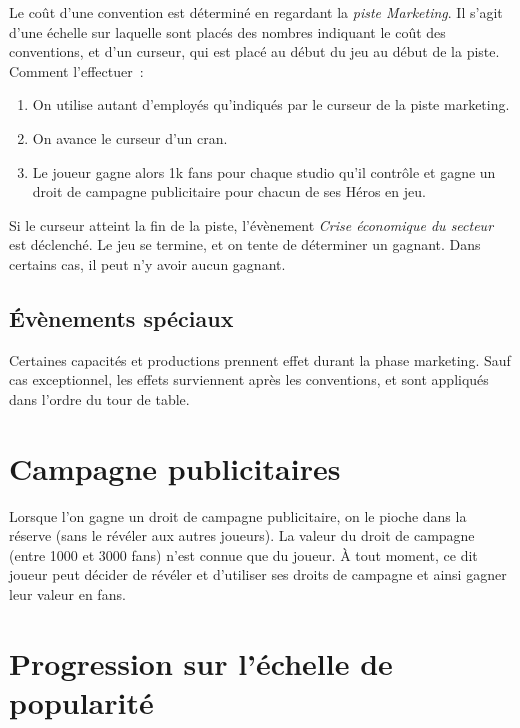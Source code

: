                 Le coût d'une convention est déterminé en regardant la \textit{piste Marketing}. Il s'agit
                d'une échelle sur laquelle sont placés des nombres indiquant le coût des conventions, et d'un
                curseur, qui est placé au début du jeu au début de la piste.
                \\
                Comment l'effectuer :
                    \begin{enumerate}
                        \item On utilise autant d'employés qu'indiqués par le curseur de la piste marketing.
                        \item On avance le curseur d'un cran.
                        \item Le joueur gagne alors 1k fans pour chaque studio qu'il contrôle et gagne un droit de campagne publicitaire pour chacun de ses Héros en jeu.
                    \end{enumerate}

                Si le curseur atteint la fin de la piste, l'évènement \textit{Crise économique du secteur} est déclenché.
                Le jeu se termine, et on tente de déterminer un gagnant. Dans certains cas, il peut n'y avoir aucun gagnant.

            \subsection{Évènements spéciaux}

                Certaines capacités et productions prennent effet durant la phase marketing.
                Sauf cas exceptionnel, les effets surviennent après les conventions, et sont
                appliqués dans l'ordre du tour de table.

        \section{Campagne publicitaires}

            Lorsque l'on gagne un droit de campagne publicitaire, on le pioche dans la réserve
            (sans le révéler aux autres joueurs). La valeur du droit de campagne (entre 1000 et 3000 fans)
            n'est connue que du joueur. À tout moment, ce dit joueur peut décider de révéler et
            d'utiliser ses droits de campagne et ainsi gagner leur valeur en fans.

        \section{Progression sur l'échelle de popularité}

